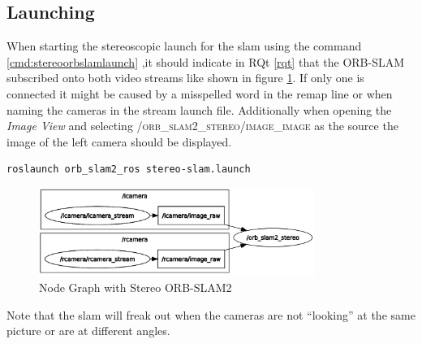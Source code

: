 \subsection{Launching}
When starting the stereoscopic launch for the \gls{slam} using the command \ref{cmd:stereoorbslamlaunch} ,it should indicate in RQt \ref{rqt} that the ORB-SLAM subscribed onto both video streams like shown in figure \ref{img:nodegraphstereoslam}. If only one is connected it might be caused by a misspelled word in the remap line or when naming the cameras in the stream launch file. Additionally when opening the \textit{Image View} and selecting \textsc{/orb\_slam2\_stereo/image\_image} as the source the image of the left camera should be displayed.\newline
\begin{lstlisting}[language=bash, label={cmd:stereoorbslamlaunch}]
    roslaunch orb_slam2_ros stereo-slam.launch
\end{lstlisting}
\begin{figure}[h]
	\centering
	\includegraphics[width=0.8\textwidth]{./media/images/nodegraphstereoorbslam.png}
  	\caption{Node Graph with Stereo ORB-SLAM2}
  	\label{img:nodegraphstereoslam}
\end{figure}
Note that the \gls{slam} will freak out when the cameras are not \enquote{looking} at the same picture or are at different angles.


